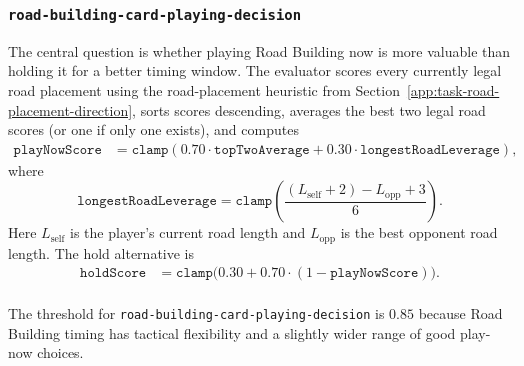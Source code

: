 \documentclass{article}
\begin{document}
\subsubsection{\texttt{road-building-card-playing-decision}}
\label{app:task-road-building-card-playing-decision}
The central question is whether playing Road Building now is more valuable than holding it for a better timing window.
The evaluator scores every currently legal road placement using the road-placement heuristic from Section~\ref{app:task-road-placement-direction}, sorts scores descending, averages the best two legal road scores (or one if only one exists), and computes
\[
\begin{aligned}
\texttt{playNowScore}
&= \texttt{clamp}(
0.70 \cdot \texttt{topTwoAverage}
+ 0.30 \cdot \texttt{longestRoadLeverage}),
\end{aligned}
\]
where
\[
\texttt{longestRoadLeverage}
= \texttt{clamp}\left(\frac{(L_{\text{self}} + 2) - L_{\text{opp}} + 3}{6}\right).
\]
Here $L_{\text{self}}$ is the player's current road length and $L_{\text{opp}}$ is the best opponent road length.
The hold alternative is
\[
\begin{aligned}
\texttt{holdScore}
&= \texttt{clamp}\bigl(
0.30 + 0.70 \cdot (1 - \texttt{playNowScore})
\bigr).
\end{aligned}
\]
\\
The threshold for \texttt{road-building-card-playing-decision} is $0.85$ because Road Building timing has tactical flexibility and a slightly wider range of good play-now choices.
\end{document}
